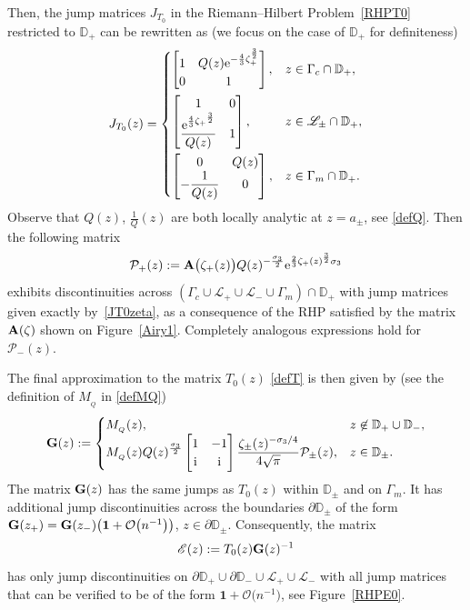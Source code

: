 \documentclass[10pt,a4paper]{amsart}
\numberwithin{equation}{section}
\theoremstyle{definition}
\def \scr{\mathscr}
\def \DD{\mathbb D}
\def \ds{\displaystyle}
\def\be{\begin{equation}}
\def\ee{\end{equation}}
\def \1{\mathbf 1}
\def\s{\sigma}
\def\pa{\partial}
\def\la{\label}
\begin{document}
Then, the jump matrices $J_{T_0}$ in the Riemann--Hilbert Problem~\ref{RHPT0} restricted to $\DD_+$ can be rewritten as (we focus on the case of $\DD_+$ for definiteness)
\begin{gather}
\label{JT0zeta}
J_{T_0}(z) =
\begin{cases}
\begin{bmatrix}
1 & Q(z) {\rm e}^{-\frac 43\zeta_+^\frac 32}\\
0& 1
\end{bmatrix},
 & z\in \Gamma_c\cap \DD_+,\vspace{1mm}\\
 \begin{bmatrix}
1 & 0 \\
\displaystyle \frac{\ds {\rm e}^{\frac 43{\zeta_+}^\frac 32} }{Q(z)} & 1
\end{bmatrix},
& z\in \scr L_\pm \cap \DD_+,
\vspace{1mm}\\
\begin{bmatrix}
 0 & Q(z) \\
\displaystyle -\frac 1 {Q(z)} & 0
\end{bmatrix},
 & z\in \Gamma_m\cap \DD_+.
\end{cases}
\end{gather}
Observe that $Q(z)$, $\frac 1 Q(z)$ are both locally analytic at $z=a_\pm$, see \eqref{defQ}.
Then the following matrix
\[
\mathcal P_+(z) := {\bf A} \bigl(\zeta_+(z)\bigr) Q(z)^{-\frac {\s_3}2} {\rm e}^{\frac 2 3\zeta_+(z)^\frac 32 \s_3}
\]
exhibits discontinuities across $(\Gamma_c\cup\scr L_+\cup \scr L_- \cup \Gamma_m)\cap \DD_+$ with jump matrices given exactly by~\eqref{JT0zeta}, as a consequence of the RHP satisfied by the matrix
${\bf A}(\zeta)$ shown on Figure~\ref{Airy1}. Completely analogous expressions hold for $\mathcal P_-(z)$.


The final approximation to the matrix $T_0(z)$ \eqref{defT} is then given by (see the definition of $M_{_Q}$ in \eqref{defMQ})
\[
{\bf G}(z):=
\begin{cases}
M_{_Q}(z), & z\not\in \DD_+\cup \DD_-,
\\
\displaystyle M_{_Q}(z) Q(z)^{\frac {\s_3}2} \begin{bmatrix}
1 & -1\\
{\rm i} & {\rm i} \\
\end{bmatrix}\frac{\ds \zeta_\pm(z)^{-\sigma_3/4}}{4\sqrt{\pi}} \mathcal P_\pm (z),& z\in \DD_\pm.
\end{cases}
\]
The matrix ${\bf G}(z)$ has the same jumps as $T_0(z)$ within $\DD_\pm$ and on $\Gamma_m$. It has additional jump discontinuities across the boundaries $\pa\DD_\pm$ of the form
$
{\bf G} (z_+)= {\bf G} (z_-)\bigl(\1 + \mathcal O\bigl(n^{-1}\bigr) \bigr)$, $z\in \pa\DD_\pm$.
Consequently, the matrix
\be
\scr E(z):= T_0(z) {\bf G}(z)^{-1}\la{errormatrix}
\ee
has only jump discontinuities on $\pa\DD_+\cup \pa \DD_- \cup \scr L_+\cup \scr L_-$ with all jump matrices that can be verified to be of the form $\1 + \mathcal O\bigl(n^{-1}\bigr)$, see Figure~\ref{RHPE0}.
\end{document}
